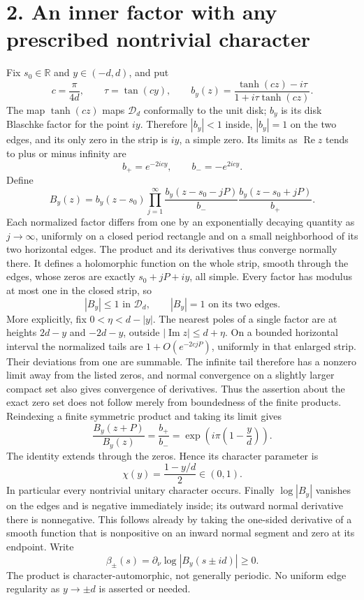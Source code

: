 \documentclass[11pt]{article}
\newcommand{\D}{\mathcal D}
\begin{document}
\section*{2. An inner factor with any prescribed nontrivial character}
Fix $s_0\in\mathbb R$ and $y\in(-d,d)$, and put
\[
 c=\frac{\pi}{4d},\qquad \tau=\tan(cy),\qquad
 b_y(z)=\frac{\tanh(cz)-i\tau}{1+i\tau\tanh(cz)}.
\]
The map $\tanh(cz)$ maps $\D_d$ conformally to the unit disk;
$b_y$ is its disk Blaschke factor for the point $iy$. Therefore
$|b_y|<1$ inside, $|b_y|=1$ on the two edges, and its only zero in
the strip is $iy$, a simple zero. Its limits as $\operatorname{Re}z$
tends to plus or minus infinity are
\[
 b_+=e^{-2icy},\qquad b_-=-e^{2icy}.
\]
Define
\[
 B_y(z)=b_y(z-s_0)\prod_{j=1}^\infty
 \frac{b_y(z-s_0-jP)}{b_-}
 \frac{b_y(z-s_0+jP)}{b_+}. \tag{8}
\]
Each normalized factor differs from one by an exponentially decaying
quantity as $j\to\infty$, uniformly on a closed period rectangle and
on a small neighborhood of its two horizontal edges. The product and
its derivatives thus converge normally there. It defines a
holomorphic function on the whole strip, smooth through the edges,
whose zeros are exactly $s_0+jP+iy$, all simple. Every factor has
modulus at most one in the closed strip, so
\[
 |B_y|\le1\text{ in }\D_d,
 \qquad |B_y|=1\text{ on its two edges}. \tag{9}
\]
More explicitly, fix $0<\eta<d-|y|$. The nearest poles of a single
factor are at heights $2d-y$ and $-2d-y$, outside
$|\operatorname{Im}z|\le d+\eta$. On a bounded horizontal interval
the normalized tails are $1+O(e^{-2cjP})$, uniformly in that enlarged
strip. Their deviations from one are summable. The infinite tail
therefore has a nonzero limit away from the listed zeros, and normal
convergence on a slightly larger compact set also gives convergence
of derivatives. Thus the assertion about the exact zero set does
not follow merely from boundedness of the finite products.
Reindexing a finite symmetric product and taking its limit gives
\[
 \frac{B_y(z+P)}{B_y(z)}=\frac{b_+}{b_-}
 =\exp\!\left(i\pi\left(1-\frac yd\right)\right).
 \tag{10}
\]
The identity extends through the zeros. Hence its character parameter
is
\[
 \chi(y)=\frac{1-y/d}{2}\in(0,1). \tag{11}
\]
In particular every nontrivial unitary character occurs. Finally
$\log|B_y|$ vanishes on the edges and is negative immediately inside;
its outward normal derivative there is nonnegative. This follows
already by taking the one-sided derivative of a smooth function
that is nonpositive on an inward normal segment and zero at its
endpoint. Write
\[
 \beta_\pm(s)=\partial_\nu\log|B_y(s\pm id)|\ge0. \tag{12}
\]
The product is character-automorphic, not generally periodic.
No uniform edge regularity as $y\to\pm d$ is asserted or needed.
\end{document}
